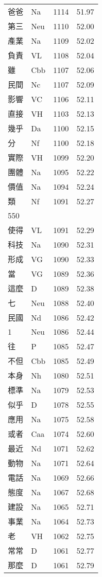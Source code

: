 \documentclass[twocolumn]{book}
\begin{document}
\begin{supertabular}{llrr}
爸爸 & Na & 1114 &  51.97\\
第三 & Neu & 1110 &  52.00\\
產業 & Na & 1109 &  52.02\\
負責 & VL & 1108 &  52.04\\
雖 & Cbb & 1107 &  52.06\\
民間 & Nc & 1107 &  52.09\\
影響 & VC & 1106 &  52.11\\
直接 & VH & 1103 &  52.13\\
幾乎 & Da & 1100 &  52.15\\
分 & Nf & 1100 &  52.18\\
實際 & VH & 1099 &  52.20\\
團體 & Na & 1095 &  52.22\\
價值 & Na & 1094 &  52.24\\
類 & Nf & 1091 &  52.27\\
550\\
使得 & VL & 1091 &  52.29\\
科技 & Na & 1090 &  52.31\\
形成 & VG & 1090 &  52.33\\
當 & VG & 1089 &  52.36\\
這麼 & D & 1089 &  52.38\\
七 & Neu & 1088 &  52.40\\
民國 & Nd & 1086 &  52.42\\
1 & Neu & 1086 &  52.44\\
往 & P & 1085 &  52.47\\
不但 & Cbb & 1085 &  52.49\\
本身 & Nh & 1080 &  52.51\\
標準 & Na & 1079 &  52.53\\
似乎 & D & 1078 &  52.55\\
應用 & Na & 1075 &  52.58\\
或者 & Caa & 1074 &  52.60\\
最近 & Nd & 1071 &  52.62\\
動物 & Na & 1071 &  52.64\\
電話 & Na & 1069 &  52.66\\
態度 & Na & 1067 &  52.68\\
建設 & Na & 1065 &  52.71\\
事業 & Na & 1064 &  52.73\\
老 & VH & 1062 &  52.75\\
常常 & D & 1061 &  52.77\\
那麼 & D & 1061 &  52.79\\

\end{supertabular}
\end{document}
